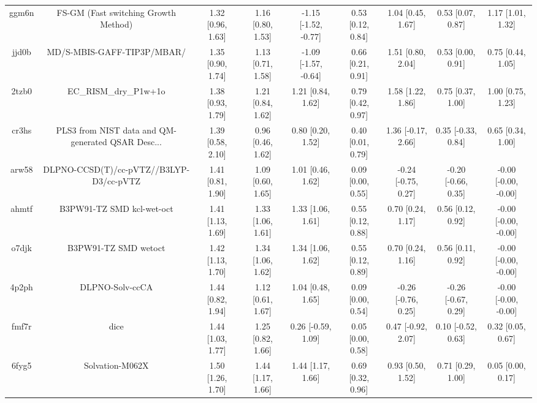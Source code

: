 \documentclass{article}
\begin{document}
\begin{center}
\begin{longtable}{|ccccccccc|}
 ggm6n &               FS-GM (Fast switching Growth Method) &  1.32 [0.96, 1.63] &  1.16 [0.80, 1.53] &  -1.15 [-1.52, -0.77] &  0.53 [0.12, 0.84] &    1.04 [0.45, 1.67] &    0.53 [0.07, 0.87] &     1.17 [1.01, 1.32] \\
 jjd0b &                         MD/S-MBIS-GAFF-TIP3P/MBAR/ &  1.35 [0.90, 1.74] &  1.13 [0.71, 1.58] &  -1.09 [-1.57, -0.64] &  0.66 [0.21, 0.91] &    1.51 [0.80, 2.04] &    0.53 [0.00, 0.91] &     0.75 [0.44, 1.05] \\
 2tzb0 &                              EC\_RISM\_dry\_P1w+1o &  1.38 [0.93, 1.79] &  1.21 [0.84, 1.62] &     1.21 [0.84, 1.62] &  0.79 [0.42, 0.97] &    1.58 [1.22, 1.86] &    0.75 [0.37, 1.00] &     1.00 [0.75, 1.23] \\
 cr3hs &  PLS3 from NIST data and QM-generated QSAR Desc... &  1.39 [0.58, 2.10] &  0.96 [0.46, 1.62] &     0.80 [0.20, 1.52] &  0.40 [0.01, 0.79] &   1.36 [-0.17, 2.66] &   0.35 [-0.33, 0.84] &     0.65 [0.34, 1.00] \\
 arw58 &            DLPNO-CCSD(T)/cc-pVTZ//B3LYP-D3/cc-pVTZ &  1.41 [0.81, 1.90] &  1.09 [0.60, 1.65] &     1.01 [0.46, 1.62] &  0.09 [0.00, 0.55] &  -0.24 [-0.75, 0.27] &  -0.20 [-0.66, 0.35] &  -0.00 [-0.00, -0.00] \\
 ahmtf &                          B3PW91-TZ SMD kcl-wet-oct &  1.41 [1.13, 1.69] &  1.33 [1.06, 1.61] &     1.33 [1.06, 1.61] &  0.55 [0.12, 0.88] &    0.70 [0.24, 1.17] &    0.56 [0.12, 0.92] &  -0.00 [-0.00, -0.00] \\
 o7djk &                               B3PW91-TZ SMD wetoct &  1.42 [1.13, 1.70] &  1.34 [1.06, 1.62] &     1.34 [1.06, 1.62] &  0.55 [0.12, 0.89] &    0.70 [0.24, 1.16] &    0.56 [0.11, 0.92] &  -0.00 [-0.00, -0.00] \\
 4p2ph &                                    DLPNO-Solv-ccCA &  1.44 [0.82, 1.94] &  1.12 [0.61, 1.67] &     1.04 [0.48, 1.65] &  0.09 [0.00, 0.54] &  -0.26 [-0.76, 0.25] &  -0.26 [-0.67, 0.29] &  -0.00 [-0.00, -0.00] \\
 fmf7r &                                               dice &  1.44 [1.03, 1.77] &  1.25 [0.82, 1.66] &    0.26 [-0.59, 1.09] &  0.05 [0.00, 0.58] &   0.47 [-0.92, 2.07] &   0.10 [-0.52, 0.63] &     0.32 [0.05, 0.67] \\
 6fyg5 &                                    Solvation-M062X &  1.50 [1.26, 1.70] &  1.44 [1.17, 1.66] &     1.44 [1.17, 1.66] &  0.69 [0.32, 0.96] &    0.93 [0.50, 1.52] &    0.71 [0.29, 1.00] &     0.05 [0.00, 0.17] \\

\end{longtable}
\end{center}
\end{document}
